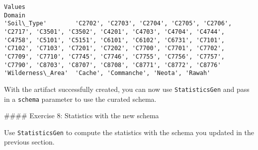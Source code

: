 \documentclass[11pt]{article}
\begin{document}
    \begin{Verbatim}[commandchars=\\\{\}]
                                                                                                                                                                                                                                                                                                                                                                                   Values
Domain                                                                                                                                                                                                                                                                                                                                                                                   
'Soil\_Type'        'C2702', 'C2703', 'C2704', 'C2705', 'C2706', 'C2717', 'C3501', 'C3502', 'C4201', 'C4703', 'C4704', 'C4744', 'C4758', 'C5101', 'C5151', 'C6101', 'C6102', 'C6731', 'C7101', 'C7102', 'C7103', 'C7201', 'C7202', 'C7700', 'C7701', 'C7702', 'C7709', 'C7710', 'C7745', 'C7746', 'C7755', 'C7756', 'C7757', 'C7790', 'C8703', 'C8707', 'C8708', 'C8771', 'C8772', 'C8776'
'Wilderness\_Area'  'Cache', 'Commanche', 'Neota', 'Rawah'                                                                                                                                                                                                                                                                                                                                
    \end{Verbatim}

    
    With the artifact successfully created, you can now use
\texttt{StatisticsGen} and pass in a \texttt{schema} parameter to use
the curated schema.

\#\#\#\# Exercise 8: Statistics with the new schema

Use \texttt{StatisticsGen} to compute the statistics with the schema you
updated in the previous section.
\end{document}
